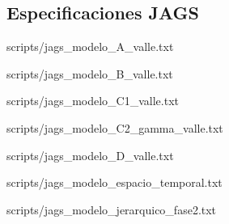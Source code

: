 \documentclass[12pt]{article}
\begin{document}
\subsection*{Especificaciones JAGS}

%
  {scripts/jags_modelo_A_valle.txt}

%
  {scripts/jags_modelo_B_valle.txt}

%
  {scripts/jags_modelo_C1_valle.txt}

%
  {scripts/jags_modelo_C2_gamma_valle.txt}

%
  {scripts/jags_modelo_D_valle.txt}

%
  {scripts/jags_modelo_espacio_temporal.txt}

%
  {scripts/jags_modelo_jerarquico_fase2.txt}
\end{document}
